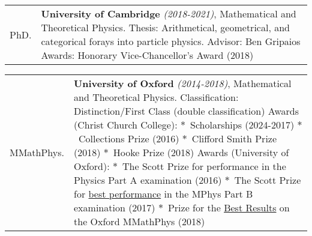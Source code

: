\documentclass[14pt,letter]{article}
\newcommand{\mybullet}{\textcolor{mycolor}{$\ast$}\ }
\newcounter{customtitle}
\begin{document}
\noindent\begin{tabular}{p{}p{}}
	PhD. &  \textbf{University of Cambridge} \emph{(2018-2021)}, Mathematical and Theoretical Physics.
	\newline 
	{\color{mycolor} Thesis:}  Arithmetical, geometrical, and categorical forays into particle physics. 
	\newline 
	{\color{mycolor} Advisor:} Ben Gripaios 
	\newline
	{\color{mycolor}Awards:} Honorary Vice-Chancellor’s Award (2018)
\end{tabular}

\noindent\begin{tabular}{p{}p{}}
	MMathPhys. &  \textbf{University of Oxford} \emph{(2014-2018)}, Mathematical and Theoretical Physics.
	\newline 
	{\color{mycolor}Classification:} { Distinction/First Class (double classification) }
	\newline 
	{\color{mycolor}Awards (Christ Church College):} \mybullet Scholarships (2024-2017) \mybullet Collections Prize (2016) \mybullet  Clifford Smith Prize (2018) \mybullet Hooke Prize (2018)
	\newline
	{\color{mycolor}Awards (University of Oxford):}  \mybullet The Scott Prize for performance in the Physics Part A examination (2016) \mybullet The Scott Prize for \underline{best performance} in the MPhys Part B examination (2017)  \mybullet Prize for the \underline{Best Results} on the Oxford MMathPhys (2018) 
\end{tabular}
%
\end{document}
